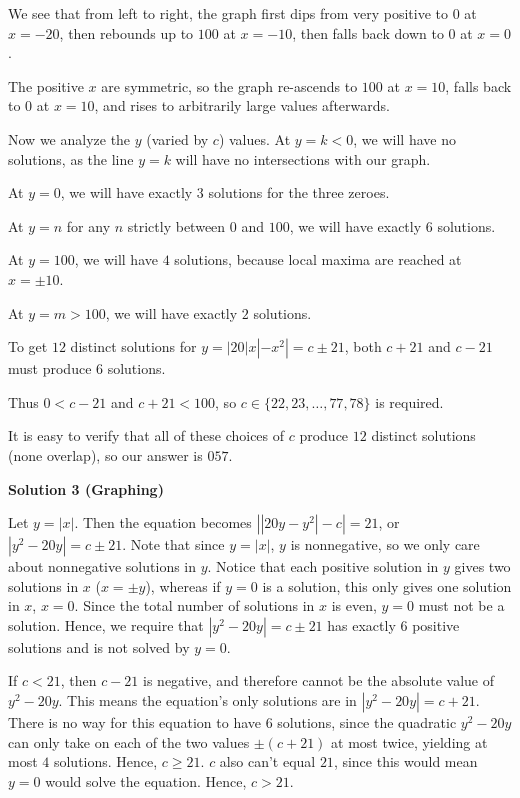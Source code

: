 \begin{enumerate}
 We see that from left to right, the graph first dips from very positive to $0$ at $x=-20$, then rebounds up to $100$ at $x=-10$, then falls back down to $0$ at $x=0$.

 The positive $x$ are symmetric, so the graph re-ascends to $100$ at $x=10$, falls back to $0$ at $x=10$, and rises to arbitrarily large values afterwards.

 Now we analyze the $y$ (varied by $c$) values. At $y=k<0$, we will have no solutions, as the line $y=k$ will have no intersections with our graph.

 At $y=0$, we will have exactly $3$ solutions for the three zeroes.

 At $y=n$ for any $n$ strictly between $0$ and $100$, we will have exactly $6$ solutions.

 At $y=100$, we will have $4$ solutions, because local maxima are reached at $x= \pm 10$.

 At $y=m>100$, we will have exactly $2$ solutions.

 To get $12$ distinct solutions for $y=|20|x|-x^2|=c \pm 21$, both $c +21$ and $c-21$ must produce $6$ solutions.

 Thus $0<c-21$ and $c+21<100$, so $c \in \{ 22, 23, \dots , 77, 78 \}$ is required.

 It is easy to verify that all of these choices of $c$ produce $12$ distinct solutions (none overlap), so our answer is $\boxed{057}$.

 



\textbf{Solution 3 (Graphing)}

Let $y = |x|.$ Then the equation becomes $\left|\left|20y-y^2\right|-c\right| = 21$, or $\left|y^2-20y\right| = c \pm 21$. Note that since $y = |x|$, $y$ is nonnegative, so we only care about nonnegative solutions in $y$. Notice that each positive solution in $y$ gives two solutions in $x$ ($x = \pm y$), whereas if $y = 0$ is a solution, this only gives one solution in $x$, $x = 0$. Since the total number of solutions in $x$ is even, $y = 0$ must not be a solution. Hence, we require that $\left|y^2-20y\right| = c \pm 21$ has exactly $6$ positive solutions and is not solved by $y = 0.$

 If $c < 21$, then $c - 21$ is negative, and therefore cannot be the absolute value of $y^2 - 20y$. This means the equation's only solutions are in $\left|y^2-20y\right| = c + 21$. There is no way for this equation to have $6$ solutions, since the quadratic $y^2-20y$ can only take on each of the two values $\pm(c + 21)$ at most twice, yielding at most $4$ solutions. Hence, $c \ge 21$. $c$ also can't equal $21$, since this would mean $y = 0$ would solve the equation. Hence, $c > 21.$


\end{enumerate}

